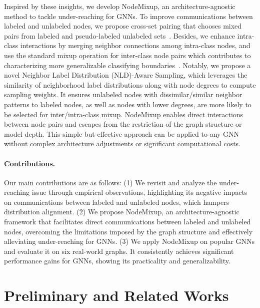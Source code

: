 \documentclass[letterpaper]{article} %
\begin{document}
Inspired by these insights, we develop NodeMixup, an architecture-agnostic method to tackle under-reaching for GNNs. To improve communications between labeled and unlabeled nodes, we propose cross-set pairing that chooses mixed pairs from labeled and pseudo-labeled unlabeled sets~\cite{pl}. Besides, we enhance intra-class interactions by merging neighbor connections among intra-class nodes, and use the standard mixup operation for inter-class node pairs which contributes to characterizing more generalizable classifying boundaries~\cite{mixup}. Notably, we propose a novel Neighbor Label Distribution (NLD)-Aware Sampling, which leverages the similarity of neighborhood label distributions along with node degrees to compute sampling weights. It ensures unlabeled nodes with dissimilar/similar neighbor patterns to labeled nodes, as well as nodes with lower degrees, are more likely to be selected for inter/intra-class mixup. NodeMixup enables direct interactions between node pairs and escapes from the restriction of the graph structure or model depth. This simple but effective approach can be applied to any GNN without complex architecture adjustments or significant computational costs.

\paragraph{Contributions.}
Our main contributions are as follows: (1) We revisit and analyze the under-reaching issue through empirical observations, highlighting its negative impacts on communications between labeled and unlabeled nodes, which hampers distribution alignment. (2) We propose NodeMixup, an architecture-agnostic framework that facilitates direct communications between labeled and unlabeled nodes, overcoming the limitations imposed by the graph structure and effectively alleviating under-reaching for GNNs. (3) We apply NodeMixup on popular GNNs and evaluate it on six real-world graphs. It consistently achieves significant performance gains for GNNs, showing its practicality and generalizability. 

\section{Preliminary and Related Works}
\label{sec:related}
\end{document}
